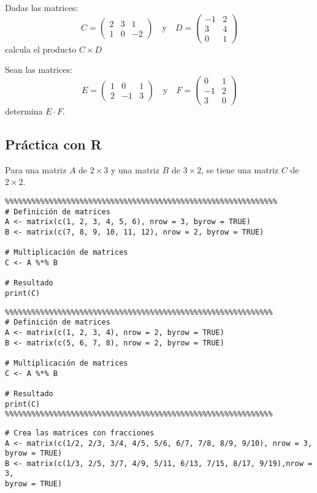 \begin{}
\begin{exercise}
\end{exercise}
\begin{exercise}
Dadas las matrices:
\[ C = \begin{pmatrix} 2 & 3 & 1 \\ 1 & 0 & -2 \end{pmatrix} \quad \text{y} \quad D = \begin{pmatrix} -1 & 2 \\ 3 & 4 \\ 0 & 1 \end{pmatrix} \]
calcula el producto \( C \times D \)    
\end{exercise}
\begin{exercise}
Sean las matrices:
\[ E = \begin{pmatrix} 1 & 0 & 1 \\ 2 & -1 & 3 \end{pmatrix} \quad \text{y} \quad F = \begin{pmatrix} 0 & 1 \\ -1 & 2 \\ 3 & 0 \end{pmatrix} \]
determina \( E \cdot F \).

\end{exercise}
\subsection{Práctica con R}
 Para una matriz $A$ de $2\times 3$ y una matriz $B$ de
$3\times2$, se tiene una matriz $C$ de $2\times2$.

\begin{verbatim}
%%%%%%%%%%%%%%%%%%%%%%%%%%%%%%%%%%%%%%%%%%%%%%%%%%%%%%%%%%%%%%
# Definición de matrices
A <- matrix(c(1, 2, 3, 4, 5, 6), nrow = 3, byrow = TRUE)
B <- matrix(c(7, 8, 9, 10, 11, 12), nrow = 2, byrow = TRUE)

# Multiplicación de matrices
C <- A %*% B

# Resultado
print(C)

\end{verbatim}

\begin{verbatim}
%%%%%%%%%%%%%%%%%%%%%%%%%%%%%%%%%%%%%%%%%%%%%%%%%%%%%%%%%%%%%
# Definición de matrices
A <- matrix(c(1, 2, 3, 4), nrow = 2, byrow = TRUE)
B <- matrix(c(5, 6, 7, 8), nrow = 2, byrow = TRUE)

# Multiplicación de matrices
C <- A %*% B

# Resultado
print(C)
%%%%%%%%%%%%%%%%%%%%%%%%%%%%%%%%%%%%%%%%%%%%%%%%%%%%%%%%%%%%%
\end{verbatim}
\begin{verbatim}
# Crea las matrices con fracciones
A <- matrix(c(1/2, 2/3, 3/4, 4/5, 5/6, 6/7, 7/8, 8/9, 9/10), nrow = 3,
byrow = TRUE)
B <- matrix(c(1/3, 2/5, 3/7, 4/9, 5/11, 6/13, 7/15, 8/17, 9/19),nrow = 3, 
byrow = TRUE)


\end{verbatim}
\end{}
